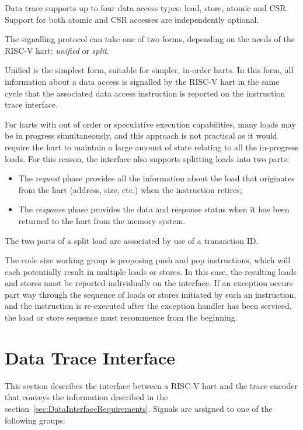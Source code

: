 Data trace supports up to four data access types: load, store, atomic and CSR.  
Support for both atomic and CSR accesses are independently optional.

The signalling protocol can take one of two forms, depending on the needs of the RISC-V 
hart: \textit{unified} or \textit{split}.

Unified is the simplest form, suitable for simpler, in-order harts.  In this form, all
information about a data access is signalled by the RISC-V hart in the
same cycle that the associated data access instruction is reported on the instruction
trace interface.  

For harts with out of order or speculative execution capabilities, many loads may be in 
progress simultaneously, and this approach is not practical as it would require the hart 
to maintain a large amount of state relating to all the in-progress loads.  For this 
reason, the interface also supports splitting loads into two parts:

\begin{itemize}
  \item The \textit{request} phase provides all the information about the load that
    originates from the hart (address, size, etc.) when the instruction retires;
  \item The \textit{response} phase provides the data and response status when it has
    been returned to the hart from the memory system.
\end{itemize}

The two parts of a split load are associated by use of a transaction ID.

The code size working group is proposing push and pop instructions,
which will each potentially result in multiple loads or stores.  In this case, the 
resulting loads and stores must be reported individually on the interface.  If an exception
occurs part way through the sequence of loads or stores initiated by such an instruction,
and the instruction is re-executed after the exception handler has been serviced, the
load or store sequence must recommence from the beginning.

\section{Data Trace Interface}\label{sec:DataTraceInterface}

This section describes the interface between a RISC-V hart and the
trace encoder that conveys the information described in the
section~\ref{sec:DataInterfaceRequirements}.  Signals are assigned to
one of the following groups:

